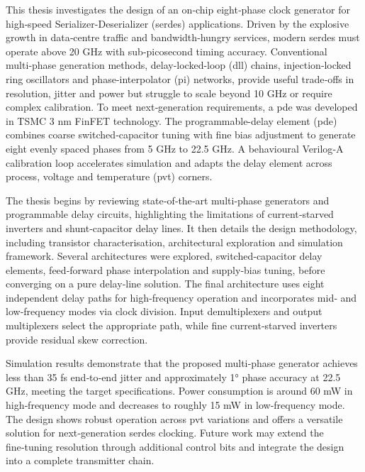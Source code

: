 This thesis investigates the design of an on‑chip eight‑phase clock generator for high‑speed Serializer-Deserializer (\gls{serdes}) applications.  Driven by the explosive growth in data‑centre traffic and bandwidth‑hungry services, modern \gls{serdes} must operate above 20 GHz with sub‑picosecond timing accuracy.  Conventional multi‑phase generation methods, delay-locked-loop (\gls{dll}) chains, injection‑locked ring oscillators and phase-interpolator (\gls{pi}) networks, provide useful trade‑offs in resolution, jitter and power but struggle to scale beyond 10 GHz or require complex calibration.  To meet next‑generation requirements, a \gls{pde} was developed in TSMC 3 nm FinFET technology.  The programmable-delay element (\gls{pde}) combines coarse switched‑capacitor tuning with fine bias adjustment to generate eight evenly spaced phases from 5 GHz to 22.5 GHz.  A behavioural Verilog‑A calibration loop accelerates simulation and adapts the delay element across process, voltage and temperature (\gls{pvt}) corners.

The thesis begins by reviewing state‑of‑the‑art multi‑phase generators and programmable delay circuits, highlighting the limitations of current‑starved inverters and shunt‑capacitor delay lines.  It then details the design methodology, including transistor characterisation, architectural exploration and simulation framework.  Several architectures were explored, switched‑capacitor delay elements, feed‑forward phase interpolation and supply‑bias tuning, before converging on a pure delay‑line solution.  The final architecture uses eight independent delay paths for high‑frequency operation and incorporates mid‑ and low‑frequency modes via clock division.  Input demultiplexers and output multiplexers select the appropriate path, while fine current‑starved inverters provide residual skew correction.

Simulation results demonstrate that the proposed multi‑phase generator achieves less than 35 fs end‑to‑end jitter and approximately 1° phase accuracy at 22.5 GHz, meeting the target specifications.  Power consumption is around 60 mW in high‑frequency mode and decreases to roughly 15 mW in low‑frequency mode.  The design shows robust operation across \gls{pvt} variations and offers a versatile solution for next‑generation \gls{serdes} clocking.  Future work may extend the fine‑tuning resolution through additional control bits and integrate the design into a complete transmitter chain.
